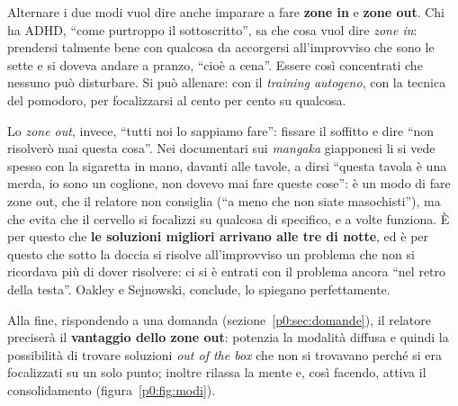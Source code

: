 Alternare i due modi vuol dire anche imparare a fare \textbf{zone in} e
\textbf{zone out}. Chi ha ADHD, ``come purtroppo il sottoscritto'', sa che
cosa vuol dire \emph{zone in}: prendersi talmente bene con qualcosa da
accorgersi all'improvviso che sono le sette e si doveva andare a pranzo,
``cioè a cena''. Essere così concentrati che nessuno può disturbare. Si può
allenare: con il \emph{training autogeno}, con la tecnica del pomodoro, per
focalizzarsi al cento per cento su qualcosa.

Lo \emph{zone out}, invece, ``tutti noi lo sappiamo fare'': fissare il
soffitto e dire ``non risolverò mai questa cosa''. Nei documentari sui
\emph{mangaka} giapponesi li si vede spesso con la sigaretta in mano,
davanti alle tavole, a dirsi ``questa tavola è una merda, io sono un
coglione, non dovevo mai fare queste cose'': è un modo di fare zone out, che
il relatore non consiglia (``a meno che non siate masochisti''), ma che
evita che il cervello si focalizzi su qualcosa di specifico, e a volte
funziona. È per questo che \textbf{le soluzioni migliori arrivano alle tre
di notte}, ed è per questo che sotto la doccia si risolve all'improvviso un
problema che non si ricordava più di dover risolvere: ci si è entrati con il
problema ancora ``nel retro della testa''. Oakley e Sejnowski, conclude, lo
spiegano perfettamente.

Alla fine, rispondendo a una domanda (sezione~\ref{p0:sec:domande}), il
relatore preciserà il \textbf{vantaggio dello zone out}: potenzia la modalità
diffusa e quindi la possibilità di trovare soluzioni \emph{out of the box}
che non si trovavano perché si era focalizzati su un solo punto; inoltre
rilassa la mente e, così facendo, attiva il consolidamento
(figura~\ref{p0:fig:modi}).

